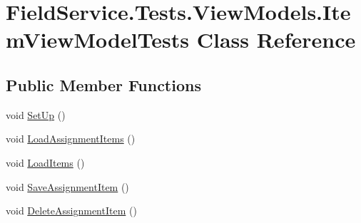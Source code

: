 \hypertarget{class_field_service_1_1_tests_1_1_view_models_1_1_item_view_model_tests}{\section{Field\+Service.\+Tests.\+View\+Models.\+Item\+View\+Model\+Tests Class Reference}
\label{class_field_service_1_1_tests_1_1_view_models_1_1_item_view_model_tests}
}
\subsection*{Public Member Functions}
\begin{DoxyCompactItemize}
\item 
void \hyperlink{class_field_service_1_1_tests_1_1_view_models_1_1_item_view_model_tests_ae87f58f130484ffe8c64b32e85c30421}{Set\+Up} ()
\item 
void \hyperlink{class_field_service_1_1_tests_1_1_view_models_1_1_item_view_model_tests_aa3a0da2a33669dc7084f3f163cd6d38e}{Load\+Assignment\+Items} ()
\item 
void \hyperlink{class_field_service_1_1_tests_1_1_view_models_1_1_item_view_model_tests_aa7dca65cb8d9e647d50005f29576d640}{Load\+Items} ()
\item 
void \hyperlink{class_field_service_1_1_tests_1_1_view_models_1_1_item_view_model_tests_a29f062b8ce6e16cf627256e6125a2c45}{Save\+Assignment\+Item} ()
\item 
void \hyperlink{class_field_service_1_1_tests_1_1_view_models_1_1_item_view_model_tests_a41a607e69940ae48a25f2db31202316e}{Delete\+Assignment\+Item} ()
\end{DoxyCompactItemize}



